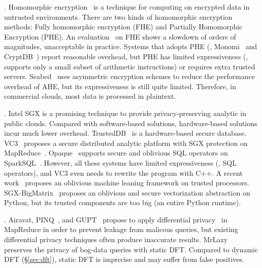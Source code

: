 . Homomorphic 
encryption~\cite{fullmomo:stoc09} is a
technique for computing on encrypted data in untrusted 
environments. There are two kinds of homomorphic encryption methods: 
Fully homomorphic encryption (FHE) and Partially 
Homomorphic Encryption (PHE). An evaluation~\cite{homo:eval} on FHE shows a 
slowdown of orders of magnitudes, unacceptable in practice. Systems that adopts 
PHE (\eg, Monomi~\cite{monomi:vldb13} and CryptDB~\cite{cryptdb:sosp11})
report reasonable overhead, but PHE has limited 
expressiveness (\eg, supports only a small subset of arithmetic instructions) 
or requires extra trusted servers. Seabed~\cite{seabed:osdi16} uses asymmetric 
encryption schemes to reduce the performance overhead of AHE, but its 
expressiveness is still quite limited. Therefore, in commercial clouds, most 
data is processed in plaintext.

. Intel SGX is a promising technique 
to provide privacy-preserving analytic in public clouds. Compared with 
software-based solutions, hardware-based solutions incur much lower overhead. 
TrustedDB~\cite{trusteddb:sigmod11} is a hardware-based secure database.
VC3~\cite{vc3:sp15} proposes a secure distributed analytic platform
with SGX protection on MapReduce~\cite{mapreduce}. 
Opaque~\cite{opaque:nsdi17} supports secure and oblivious SQL operators on 
SparkSQL~\cite{sparksql:sigmod15}. However, all these systems have limited 
expressiveness (\eg, SQL operators), and VC3 even needs to rewrite the program 
with C++. A recent work~\cite{oblivious:security16} proposes an oblivious 
machine leaning framework on trusted processors. 
SGX-BigMatrix~\cite{bigmatrix:ccs17} proposes an oblivious and secure 
vectorization abstraction on Python, but its trusted components are too big (an 
entire Python runtime).


.  
Airavat\cite{airavat:nsdi10}, PINQ~\cite{pinq:sigmod09}, and 
GUPT~\cite{gupt:sigmod12} propose to apply differential 
privacy~\cite{noise:tcc06} in MapReduce in order to prevent leakage from 
malicous queries, but existing differential privacy techniques often produce
inaccurate results. MrLazy~\cite{hotcloud14:mrlazy} preserves the privacy of 
bog-data queries with static DFT. Compared to dynamic DFT (\S\ref{sec:dft}), 
static DFT is imprecise and may suffer from false positives.

